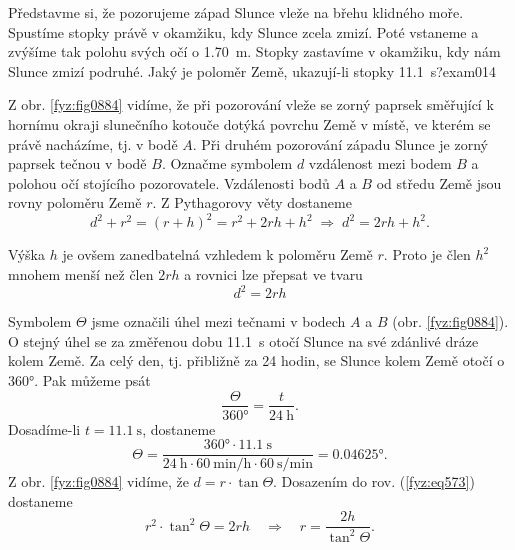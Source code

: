\begin{fyzexam}{Představme si, že pozorujeme západ Slunce vleže na břehu klidného moře. Spustíme
  stopky právě v okamžiku, kdy Slunce zcela zmizí. Poté vstaneme a zvýšíme tak polohu svých očí o
  \SI{1.70}{\m}. Stopky zastavíme v okamžiku, kdy nám Slunce zmizí podruhé. Jaký je poloměr Země,
  ukazují-li stopky \SI{11.1}{\s}?}{exam014}

  {\centering
   \captionsetup{type=figure}
   \label{fyz:fig0885}
   \par
  }

  Z obr. \ref{fyz:fig0884} vidíme, že při pozorování vleže se zorný paprsek směřující k hornímu
  okraji slunečního kotouče dotýká povrchu Země v místě, ve kterém se právě nacházíme, tj. v bodě
  \(A\). Při druhém pozorování západu Slunce je zorný paprsek tečnou v bodě \(B\). Označme symbolem
  \(d\) vzdálenost mezi bodem \(B\) a polohou očí stojícího pozorovatele. Vzdálenosti bodů \(A\) a
  \(B\) od středu Země jsou rovny poloměru Země \(r\). Z Pythagorovy věty dostaneme
  \begin{equation*}
    d^2 + r^2 = (r + h)^2 = r^2 + 2rh + h^2\;\Rightarrow\; d^2 = 2rh + h^2.
  \end{equation*}

  Výška \(h\) je ovšem zanedbatelná vzhledem k poloměru Země \(r\). Proto je člen \(h^2\) mnohem
  menší než člen \(2rh\) a rovnici lze přepsat ve tvaru
  \begin{equation}\label{fyz:eq573}
    d^2 = 2rh
  \end{equation}

  Symbolem \(\varTheta\) jsme označili úhel mezi tečnami v bodech \(A\) a \(B\) (obr.
  \ref{fyz:fig0884}). O stejný úhel se za změřenou dobu \SI{11.1}{\s} otočí Slunce na své zdánlivé
  dráze kolem Země. Za celý den, tj. přibližně za \num{24} hodin, se Slunce kolem Země otočí o
  \ang{360}. Pak můžeme psát
  \begin{equation*}
    \dfrac{\varTheta}{\ang{360}} = \dfrac{t}{\SI{24}{\hour}}.
  \end{equation*}
  Dosadíme-li \(t = \SI{11.1}{\s}\), dostaneme
  \begin{equation*}
    \varTheta = \dfrac{\ang{360}\cdot\SI{11.1}{\s}}
                      {\SI{24}{\hour}\cdot\SI{60}{\minute\per\hour}\cdot\SI{60}{\s\per\minute}}
              =\ang{0.04625}.
  \end{equation*}
  Z obr. \ref{fyz:fig0884} vidíme, že \(d = r\cdot\tan{\varTheta}\). Dosazením do rov.
  (\ref{fyz:eq573}) dostaneme
  \begin{equation}\label{fyz:eq574}
    r^2\cdot\tan^2{\varTheta} = 2rh\quad\Rightarrow\quad 
    r = \dfrac{2h}{\tan^2{\varTheta}}.
  \end{equation}


\end{fyzexam}
